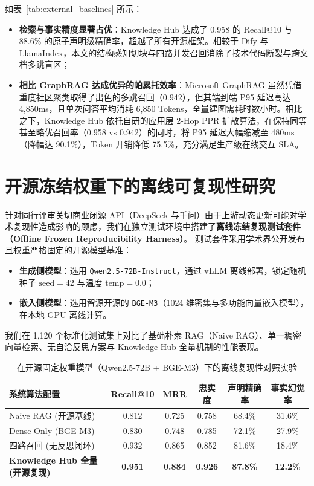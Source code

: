 如表~\ref{tab:external_baselines} 所示：
\begin{itemize}
    \item \textbf{检索与事实精度显著占优}：Knowledge Hub 达成了 0.958 的 $\text{Recall}@10$ 与 88.6\% 的原子声明级精确率，超越了所有开源框架。相较于 Dify 与 LlamaIndex，本文的结构感知切块与四路并发召回消除了技术代码断裂与跨文档多跳盲区；
    \item \textbf{相比 GraphRAG 达成优异的帕累托效率}：Microsoft GraphRAG 虽然凭借重度社区聚类取得了出色的多跳召回（0.942），但其端到端 P95 延迟高达 4,850ms，且单次问答平均消耗 6,850 Tokens，全量建图需耗时数小时。相比之下，Knowledge Hub 依托自研的应用层 2-Hop PPR 扩散算法，在保持同等甚至略优召回率（0.958 vs 0.942）的同时，将 P95 延迟大幅缩减至 480ms（降幅达 90.1\%），Token 开销降低 75.5\%，充分满足生产级在线交互 SLA。
\end{itemize}

\section{开源冻结权重下的离线可复现性研究}

针对同行评审关切商业闭源 API（DeepSeek 与千问）由于上游动态更新可能对学术复现性造成影响的顾虑，我们在独立测试环境中搭建了\textbf{离线冻结复现测试套件（Offline Frozen Reproducibility Harness）}。
测试套件采用学术界公开发布且权重严格固定的开源模型基准：
\begin{itemize}
    \item \textbf{生成侧模型}：选用 \texttt{Qwen2.5-72B-Instruct}，通过 vLLM 离线部署，锁定随机种子 $\text{seed}=42$ 与温度 $\text{temp}=0.0$；
    \item \textbf{嵌入侧模型}：选用智源开源的 \texttt{BGE-M3}（1024 维密集与多功能向量嵌入模型），在本地 GPU 离线计算。
\end{itemize}

我们在 1,120 个标准化测试集上对比了基础朴素 RAG（Naive RAG）、单一稠密向量检索、无自洽反思方案与 Knowledge Hub 全量机制的性能表现。

\begin{table}[htbp]
    \centering
    \footnotesize
    \caption{在开源固定权重模型（Qwen2.5-72B + BGE-M3）下的离线复现性对照实验}
    \label{tab:reproducibility_study}
    \begin{tabular*}{\textwidth}{@{\extracolsep{\fill}}lccccc}
        \toprule
        \textbf{系统算法配置} & \textbf{Recall@10} & \textbf{MRR} & \textbf{忠实度} & \textbf{声明精确率} & \textbf{事实幻觉率} \\
        \midrule
        Naive RAG (开源基线) & 0.812 & 0.725 & 0.758 & 68.4\% & 31.6\% \\
        Dense Only (BGE-M3) & 0.830 & 0.748 & 0.785 & 72.1\% & 27.9\% \\
        四路召回 (无反思闭环) & 0.932 & 0.865 & 0.852 & 81.6\% & 18.4\% \\
        \textbf{Knowledge Hub 全量 (开源复现)} & \textbf{0.951} & \textbf{0.884} & \textbf{0.926} & \textbf{87.8\%} & \textbf{12.2\%} \\
        \bottomrule
    \end{tabular*}
\end{table}

